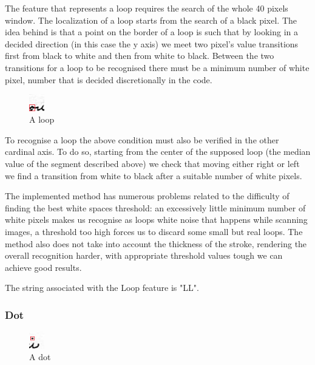 The feature that represents a loop requires the search of the whole 40 pixels window.
The localization of a loop starts from the search of a black pixel. The idea behind is that a point on the border of a loop is such that by looking in a decided direction (in this case the y axis) we meet two pixel's value transitions first from black to white and then from white to black. Between the two transitions for a loop to be recognised there must be a minimum number of white pixel, number that is decided discretionally in the code.

\begin{figure}
  \vspace{-20pt}
  \begin{center}
    \includegraphics[width=0.06\textwidth]{images/loop.jpg}
  \end{center}
  \vspace{-20pt}
  \caption{A loop}
  \vspace{-10pt}
\end{figure}

To recognise a loop the above condition must also be verified in the other cardinal axis. To do so, starting from the center of the supposed loop (the median value of the segment described above) we check that moving either right or left we find a transition from white to black after a suitable number of white pixels.

The implemented method has numerous problems related to the difficulty of finding the best white spaces threshold: an excessively little minimum number of white pixels makes us recognise as loops white noise that happens while scanning images, a threshold too high forces us to discard some small but real loops. The method also does not take into account the thickness of the stroke, rendering the overall recognition harder, with appropriate threshold values tough we can achieve good results.

The string associated with the Loop feature is "LL".
\subsubsection{Dot}

\begin{figure}
  \vspace{-20pt}
  \begin{center}
    \includegraphics[width=0.06\textwidth]{images/dot}
  \end{center}
  \vspace{-20pt}
  \caption{A dot}
  \vspace{-10pt}
\end{figure}

